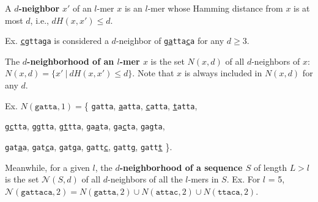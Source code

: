 \documentclass[oneside,12pt]{DISCSthesis}
\begin{document}
		
		\noindent A {\boldmath\bf $d$-neighbor} $x'$ of an $l$-mer $x$ is an $l$-mer whose Hamming distance from $x$ is at most $d$, i.e., {\boldmath $dH (x, x') \leq d$}.

		\noindent \hspace*{35pt} Ex. \texttt{\ul{cg}tta\ul{g}a} is considered a $d$-neighbor of \texttt{\ul{ga}tta\ul{c}a} for any $d \geq 3$.\newline

		\noindent The \textbf{\boldmath $d$-neighborhood of an $l$-mer $x$} is the set {\boldmath $N(x, d)$} of all $d$-neighbors of $x$: $N(x,d) = \{ x'\ |\ dH(x, x') \leq d\}$. Note that $x$ is always included in $N(x,d)$ for any $d$.\newline
		
		\noindent\begin{minipage}{\textwidth} {
				\noindent\hspace*{35pt} Ex. $N(\texttt{gatta}, 1) =$\{ \texttt{gatta},
					\texttt{\ul{a}atta}, \texttt{\ul{c}atta}, \texttt{\ul{t}atta},				
					
					\hspace*{150pt}\texttt{g\ul{c}tta}, \texttt{g\ul{g}tta}, \texttt{g\ul{t}tta},
					\texttt{ga\ul{a}ta}, \texttt{ga\ul{c}ta}, \texttt{ga\ul{g}ta},

				 	\hspace*{150pt}\texttt{gat\ul{a}a}, \texttt{gat\ul{c}a}, \texttt{gat\ul{g}a},
				 	\texttt{gatt\ul{c}}, \texttt{gatt\ul{g}}, \texttt{gatt\ul{t}} \}.

		}\end{minipage}\newline

		\noindent Meanwhile, for a given $l$, the \textbf{\boldmath $d$-neighborhood of a sequence $S$} of length $L > l$ is the set {\boldmath $\mathcal{N}(S, d)$} of all $d$-neighbors of all the $l$-mers in $S$.
		\newline\hspace*{35pt} Ex. For $l$ = 5,
			$\mathcal{N}(\texttt{gattaca}, 2) 
					= N(\texttt{gatta}, 2) \cup 
						N(\texttt{attac}, 2) \cup
						N(\texttt{ttaca}, 2)$.\newline
		
\end{document}
